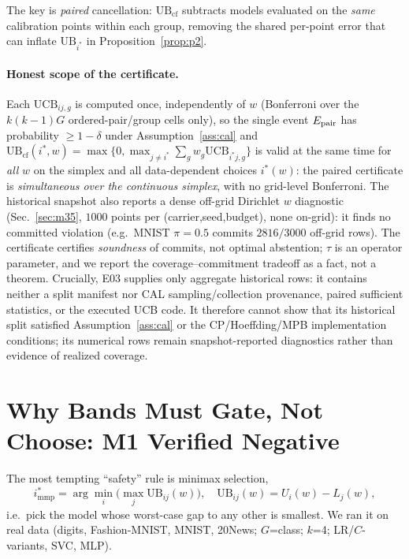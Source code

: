 \documentclass{article}
\begin{document}
The key is \emph{paired} cancellation: $\mathrm{UB}_{\mathrm{cf}}$ subtracts models evaluated
on the \emph{same} calibration points within each group, removing the shared per-point error
that can inflate $\mathrm{UB}_{i^*}$ in Proposition~\ref{prop:p2}.

\paragraph{Honest scope of the certificate.} Each $\mathrm{UCB}_{ij,g}$ is computed once,
independently of $w$ (Bonferroni over the $k(k-1)G$ ordered-pair/group cells only), so the
single event $E_{\rm pair}$ has probability $\ge1-\delta$ under Assumption~\ref{ass:cal} and
$\mathrm{UB}_{\mathrm{cf}}(i^*,w)=\max\{0,\max_{j\ne i^*}\sum_g w_g\mathrm{UCB}_{i^*j,g}\}$ is valid at the same
time for \emph{all} $w$ on the simplex and all data-dependent choices $i^*(w)$: the paired
certificate is \emph{simultaneous over the continuous simplex}, with no grid-level Bonferroni.
The historical snapshot also reports a dense off-grid Dirichlet $w$ diagnostic
(Sec.~\ref{sec:m35}, $1000$ points per (carrier,seed,budget), none on-grid): it finds no
committed violation (e.g.\ MNIST $\pi{=}0.5$ commits $2816/3000$ off-grid rows). The
certificate certifies \emph{soundness} of commits, not optimal abstention; $\tau$ is an
operator parameter, and we report the coverage--commitment tradeoff as a fact, not a theorem.
Crucially, E03 supplies only aggregate historical rows: it contains neither a split manifest nor
CAL sampling/collection provenance, paired sufficient statistics, or the executed UCB code.
It therefore cannot show that its historical split satisfied Assumption~\ref{ass:cal} or the
CP/Hoeffding/MPB implementation conditions; its numerical rows remain snapshot-reported
diagnostics rather than evidence of realized coverage.

\section{Why Bands Must Gate, Not Choose: M1 Verified Negative}
\label{sec:m1}

The most tempting ``safety'' rule is minimax selection,
\[
  i^*_{\mathrm{mmp}}=\arg\min_i \Big(\max_j \mathrm{UB}_{ij}(w)\Big),\quad
  \mathrm{UB}_{ij}(w)=U_i(w)-L_j(w),
\]
i.e.\ pick the model whose worst-case gap to any other is smallest. We ran it on real data
(digits, Fashion-MNIST, MNIST, 20News; $G$=class; $k$=4; LR/$C$-variants, SVC, MLP).
\end{document}

